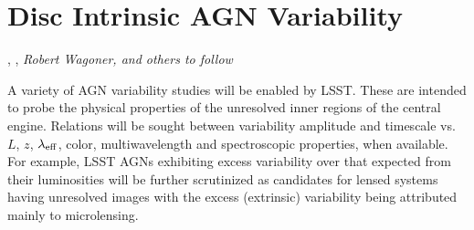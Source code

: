 %
%
%
%
%
%
%

\section{Disc Intrinsic AGN Variability}
\def\secname{\chpname:variability}\label{sec:\secname}

,
,
{\it Robert Wagoner, and others to follow}



A variety of AGN variability studies will be enabled by LSST. These are
intended to probe the physical properties of the unresolved inner regions
of the central engine. Relations will be sought between variability amplitude
and timescale vs. $L$, $z$, $\lambda_{\rm eff}$, color, multiwavelength and
spectroscopic properties, when available. For example, LSST AGNs exhibiting excess
variability over that expected from their luminosities will be further scrutinized
as candidates for lensed systems having unresolved images with the excess
(extrinsic) variability being attributed mainly to microlensing.

